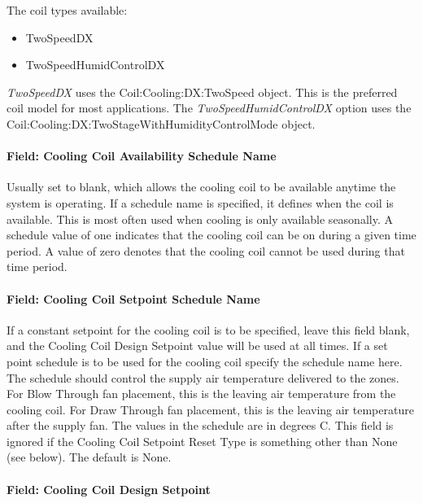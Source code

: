 The coil types available:

\begin{itemize}
\item
  TwoSpeedDX
\item
  TwoSpeedHumidControlDX
\end{itemize}

\emph{TwoSpeedDX} uses the Coil:Cooling:DX:TwoSpeed object. This is the preferred coil model for most applications. The \emph{TwoSpeedHumidControlDX} option uses the Coil:Cooling:DX:TwoStageWithHumidityControlMode object.

\paragraph{Field: Cooling Coil Availability Schedule Name}\label{field-cooling-coil-availability-schedule-name-8}

Usually set to blank, which allows the cooling coil to be available anytime the system is operating. If a schedule name is specified, it defines when the coil is available. This is most often used when cooling is only available seasonally. A schedule value of one indicates that the cooling coil can be on during a given time period. A value of zero denotes that the cooling coil cannot be used during that time period.

\paragraph{Field: Cooling Coil Setpoint Schedule Name}\label{field-cooling-coil-setpoint-schedule-name-1}

If a constant setpoint for the cooling coil is to be specified, leave this field blank, and the Cooling Coil Design Setpoint value will be used at all times. If a set point schedule is to be used for the cooling coil specify the schedule name here. The schedule should control the supply air temperature delivered to the zones. For Blow Through fan placement, this is the leaving air temperature from the cooling coil. For Draw Through fan placement, this is the leaving air temperature after the supply fan. The values in the schedule are in degrees C. This field is ignored if the Cooling Coil Setpoint Reset Type is something other than None (see below). The default is None.

\paragraph{Field: Cooling Coil Design Setpoint}\label{field-cooling-coil-design-setpoint-2}

